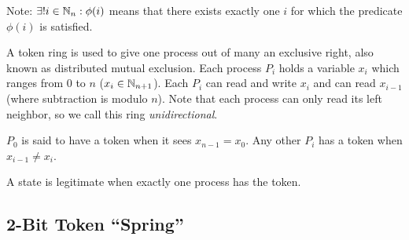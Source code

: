 Note: $\exists! i\in\mathbb{N}_n: \phi(i)$ means that there exists exactly one $i$ for which the predicate $\phi(i)$ is satisfied.

A token ring is used to give one process out of many an exclusive right, also known as distributed mutual exclusion.
Each process $P_i$ holds a variable $x_i$ which ranges from $0$ to $n$ ($x_i\in\mathbb{N}_{n+1}$).
Each $P_i$ can read and write $x_i$ and can read $x_{i-1}$ (where subtraction is modulo $n$).
Note that each process can only read its left neighbor, so we call this ring {\em unidirectional}.

$P_0$ is said to have a token when it sees $x_{n-1} = x_0$.
Any other $P_i$ has a token when $x_{i-1} \neq x_i$.

A state is legitimate when exactly one process has the token.

\subsection{2-Bit Token ``Spring'' \cite{dij}}

